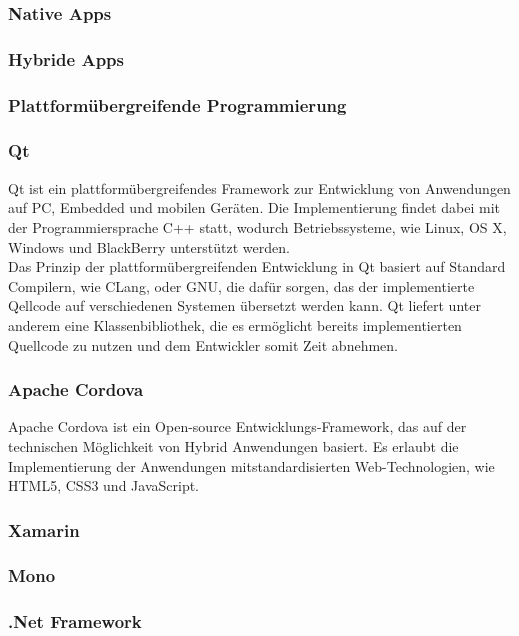 \subsubsection*{Native Apps}
\subsubsection*{Hybride Apps}

\subsubsection{Plattformübergreifende Programmierung}

\subsubsection*{Qt}

Qt ist ein plattformübergreifendes Framework zur Entwicklung von Anwendungen auf PC, Embedded und mobilen Geräten. Die Implementierung findet dabei mit der Programmiersprache C++ statt, wodurch Betriebssysteme, wie Linux, OS X, Windows und BlackBerry unterstützt werden.\\
Das Prinzip der plattformübergreifenden Entwicklung in Qt basiert auf Standard Compilern, wie CLang, oder GNU, die dafür sorgen, das der implementierte Qellcode auf verschiedenen Systemen übersetzt werden kann. Qt liefert unter anderem eine Klassenbibliothek, die es ermöglicht bereits implementierten Quellcode zu nutzen und dem Entwickler somit Zeit abnehmen.\\

\subsubsection*{Apache Cordova}

Apache Cordova ist ein Open-source Entwicklungs-Framework, das auf der technischen Möglichkeit von Hybrid Anwendungen basiert. Es erlaubt die Implementierung der Anwendungen mitstandardisierten Web-Technologien, wie HTML5, CSS3 und JavaScript.\\


\subsubsection*{Xamarin}
\subsubsection{Mono}
\subsubsection{.Net Framework}

